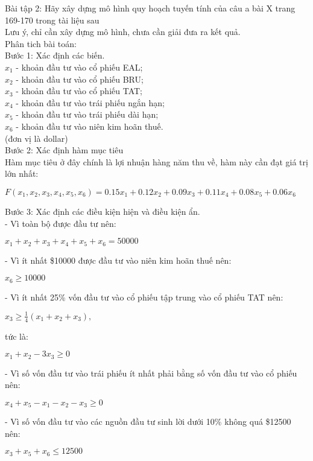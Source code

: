 \documentclass[12pt, draft]{article}
\begin{document}
Bài tập 2: Hãy xây dựng mô hình quy hoạch tuyến tính của câu a bài X trang 169-170 trong tài liệu sau 
\\
Lưu ý, chỉ cần xây dựng mô hình, chưa cần giải đưa ra kết quả.
\\
Phân tich bài toán:
\\
Bước 1: Xác định các biến.
\\
$x_1$ - khoản đầu tư vào cổ phiếu EAL;
\\
$x_2$ - khoản đầu tư vào cổ phiếu BRU;
\\
$x_3$ - khoản đầu tư vào cổ phiếu TAT;
\\
$x_4$ - khoản đầu tư vào trái phiếu ngắn hạn;
\\
$x_5$ - khoản đầu tư vào trái phiếu dài hạn;
\\
$x_6$ - khoản đầu tư vào niên kim hoãn thuế.
\\
(đơn vị là dollar)
\\
Bước 2: Xác định hàm mục tiêu
\\
Hàm mục tiêu ở đây chính là lợi nhuận hàng năm thu về, hàm này cần đạt giá trị lớn nhất:
\begin{center}
    $F(x_1, x_2, x_3, x_4, x_5, x_6) = 0.15 x_1 + 0.12 x_2 + 0.09 x_3 + 0.11 x_4 + 0.08 x_5 + 0.06 x_6$
\end{center}
Bước 3: Xác định các điều kiện hiện và điều kiện ẩn.
\\
- Vì toàn bộ  được đầu tư nên:
\begin{center}
    $x_1 + x_2 + x_3 + x_4 + x_5 + x_6 = 50000$
\end{center}
- Vì ít nhất \$10000 được đầu tư vào niên kim hoãn thuế nên:
\begin{center}
    $x_6 \geq 10000$
\end{center}
- Vì ít nhất 25\% vốn đầu tư vào cổ phiếu tập trung vào cổ phiếu TAT nên:
\begin{center}
    $x_3 \geq \frac{1}{4} (x_1 + x_2 + x_3),$
\end{center}
tức là:
\begin{center}
    $x_1 + x_2 - 3 x_3 \geq 0$
\end{center}
- Vì số vốn đầu tư vào trái phiếu ít nhất phải bằng số vốn đầu tư vào cổ phiếu nên:
\begin{center}
    $x_4 + x_5 - x_1 - x_2 - x_3 \geq 0$
\end{center}
- Vì số vốn đầu tư vào các nguồn đầu tư sinh lời dưới 10\% không quá \$12500 nên:
\begin{center}
    $x_3 + x_5 + x_6 \leq 12500$
\end{center}
\end{document}

